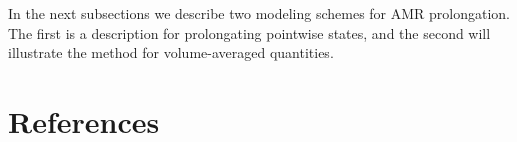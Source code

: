 \documentclass{article}%
\begin{document}
In the next subsections we describe two modeling schemes for AMR prolongation. The first is a description for
prolongating pointwise states, and the second will illustrate the method for volume-averaged quantities.
\newpage

\section*{References}
\label{sec:references}


\end{document}
